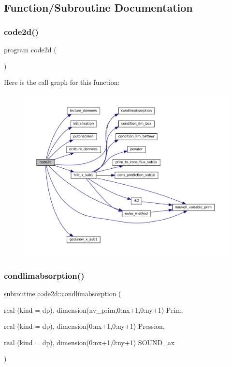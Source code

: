 \subsection{Function/\+Subroutine Documentation}
\mbox{\label{mainSW_8f90_a8712173bc20143ca5b1b8cbd782b563e}} 
\subsubsection{\texorpdfstring{code2d()}{code2d()}}
{\footnotesize\ttfamily program code2d (\begin{DoxyParamCaption}{ }\end{DoxyParamCaption})}

Here is the call graph for this function\+:
\nopagebreak
\begin{figure}[H]
\begin{center}
\leavevmode
\includegraphics[width=350pt]{mainSW_8f90_a8712173bc20143ca5b1b8cbd782b563e_cgraph}
\end{center}
\end{figure}
\mbox{\label{mainSW_8f90_a90165511d1e957b38e88d5aa8e349b60}} 
\subsubsection{\texorpdfstring{condlimabsorption()}{condlimabsorption()}}
{\footnotesize\ttfamily subroutine code2d\+::condlimabsorption (\begin{DoxyParamCaption}\item[{real (kind = dp), dimension(nv\+\_\+prim,0\+:nx+1,0\+:ny+1)}]{Prim,  }\item[{real (kind = dp), dimension(0\+:nx+1,0\+:ny+1)}]{Pression,  }\item[{real (kind = dp), dimension(0\+:nx+1,0\+:ny+1)}]{S\+O\+U\+N\+D\+\_\+ax }\end{DoxyParamCaption})}

